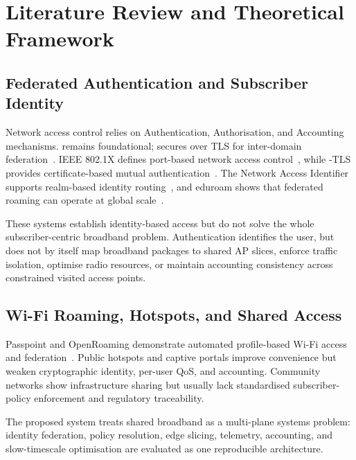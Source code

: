 \chapter{Literature Review and Theoretical Framework}
\label{ch:litreview}

\section{Federated Authentication and Subscriber Identity}
\label{sec:lit-aaa}

Network access control relies on Authentication, Authorisation, and Accounting mechanisms. \radius{} remains foundational; \radsec{} secures \radius{} over TLS for inter-domain federation~\cite{rfc6614}. IEEE 802.1X defines port-based network access control~\cite{ieee8021x}, while \eap{}-TLS provides certificate-based mutual authentication~\cite{rfc9190}. The Network Access Identifier supports realm-based identity routing~\cite{rfc7542}, and eduroam shows that federated roaming can operate at global scale~\cite{rfc7593}.

These systems establish identity-based access but do not solve the whole subscriber-centric broadband problem. Authentication identifies the user, but does not by itself map broadband packages to shared AP slices, enforce traffic isolation, optimise radio resources, or maintain accounting consistency across constrained visited access points.

\section{Wi-Fi Roaming, Hotspots, and Shared Access}
\label{sec:lit-wifi}

Passpoint and OpenRoaming demonstrate automated profile-based Wi-Fi access and federation~\cite{passpoint2024,wba-openroaming}. Public hotspots and captive portals improve convenience but weaken cryptographic identity, per-user QoS, and accounting. Community networks show infrastructure sharing but usually lack standardised subscriber-policy enforcement and regulatory traceability.

The proposed system treats shared broadband as a multi-plane systems problem: identity federation, policy resolution, edge slicing, telemetry, accounting, and slow-timescale optimisation are evaluated as one reproducible architecture.

